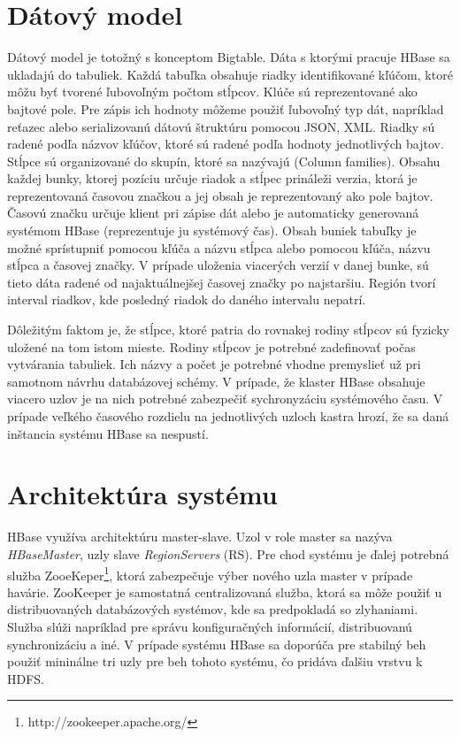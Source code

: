 \documentclass[11pt,twoside,a4paper]{book}
\begin{document}
\section{Dátový model}

Dátový model je totožný s konceptom Bigtable. Dáta s ktorými pracuje HBase sa ukladajú do tabuliek. Každá tabuľka obsahuje riadky identifikované kľúčom, ktoré môžu byť tvorené ľubovoľným počtom stĺpcov. Klúče sú reprezentované ako bajtové pole. Pre zápis ich hodnoty môžeme použiť ľubovoľný typ dát, napríklad reťazec alebo serializovanú dátovú štruktúru pomocou JSON, XML. Riadky sú radené podľa názvov kľúčov, ktoré sú radené podľa hodnoty jednotlivých bajtov. Stĺpce sú organizované do skupín, ktoré sa nazývajú  (Column families). Obsahu každej bunky, ktorej pozíciu určuje riadok a stĺpec prináleži verzia, ktorá je reprezentovaná časovou značkou a jej obsah je reprezentovaný ako pole bajtov. Časovú značku určuje klient pri zápise dát alebo je automaticky generovaná systémom HBase (reprezentuje ju systémový čas). Obsah buniek tabuľky je možné sprístupniť pomocou kľúča a názvu stĺpca alebo pomocou kľúča, názvu stĺpca a časovej značky. V prípade uloženia viacerých verzií v danej bunke, sú tieto dáta radené od najaktuálnejšej časovej značky po najstaršiu. Región tvorí interval riadkov, kde posledný riadok do daného intervalu nepatrí.

Dôležitým faktom je, že stĺpce, ktoré patria do rovnakej rodiny stĺpcov sú fyzicky uložené na tom istom mieste. Rodiny stĺpcov je potrebné zadefinovať počas vytvárania tabuliek. Ich názvy a počet je potrebné vhodne premyslieť už pri samotnom návrhu databázovej schémy. V prípade, že klaster HBase obsahuje viacero uzlov je na nich potrebné zabezpečiť sychronyzáciu systémového času. V prípade veľkého časového rozdielu na jednotlivých uzloch kastra hrozí, že sa daná inštancia systému HBase sa nespustí.


\section{Architektúra systému}

HBase využíva architektúru master-slave. Uzol v role master sa nazýva \emph{HBaseMaster}, uzly slave \emph{RegionServers} (RS). Pre chod systému je ďalej potrebná služba ZooeKeper\footnote{http://zookeeper.apache.org/}, ktorá zabezpečuje výber nového uzla master v prípade havárie. ZooKeeper je samostatná centralizovaná služba, ktorá sa môže použiť u distribuovaných databázových systémov, kde sa predpokladá so zlyhaniami. Služba slúži napríklad pre správu konfiguračných informácií, distribuovanú synchronizáciu a iné. V prípade systému HBase sa doporúča pre stabilný beh použiť mininálne tri uzly pre beh tohoto systému, čo pridáva ďalšiu vrstvu k HDFS.
\end{document}
